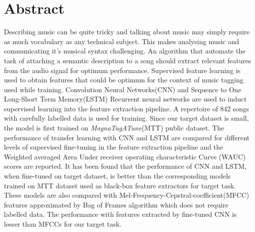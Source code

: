 \documentclass{book}
\begin{document}
\aicescoverpage


\section*{Abstract}

Describing music can be quite tricky and talking about music may simply require as much vocabulary as any technical subject. This makes analysing music and communicating it's musical syntax challenging. An algorithm that  automate the task of attaching a semantic description to a song should extract relevant features from the audio signal for optimum performance.
Supervised feature learning is used to obtain features that could be optimum for the context of music tagging used while training. Convolution Neural Networks(CNN) and Sequence to One Long-Short Term Memory(LSTM) Recurrent neural networks are used to induct supervised learning into the feature extraction pipeline. A repertoire of 842 songs with carefully labelled data is used for training. Since our target dataset is small, the model is first trained on \textit{MagnaTagATune}(MTT) public dataset. The performance of transfer learning with CNN and LSTM are compared for different levels of supervised fine-tuning in the feature extraction pipeline and the Weighted averaged Area Under receiver operating characteristic Curve (WAUC) scores are reported. It has been found that the performance of CNN and LSTM, when fine-tuned on target dataset, is better than the corresponding models trained on MTT dataset used as black-box feature extractors for target task. These models are also compared with Mel-Frequency-Cepstral-coefficient(MFCC) features approximated by Bag of Frames algorithm which does not require labelled data. The performance with features extracted by fine-tuned CNN is lesser than MFCCs for our target task.   
  

\vspace{5cm}


\newpage
\end{document}

